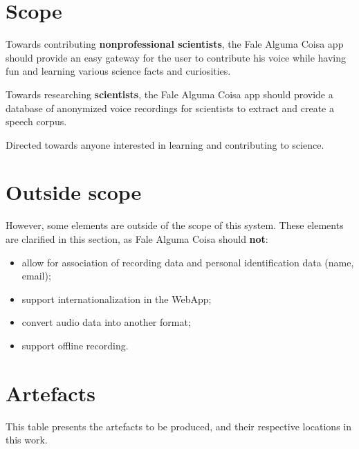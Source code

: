 \section{Scope}
\label{sec:app-scope}

Towards contributing \textbf{nonprofessional scientists}, the Fale Alguma Coisa app should provide an easy gateway for the user to contribute his voice while having fun and learning various science facts and curiosities.

Towards researching \textbf{scientists}, the Fale Alguma Coisa app should provide a database of anonymized voice recordings for scientists to extract and create a speech corpus.

Directed towards anyone interested in learning and contributing to science.

\section{Outside scope}

However, some elements are outside of the scope of this system. These elements are clarified in this section, as Fale Alguma Coisa should \textbf{not}:
\begin{itemize}
    \item allow for association of recording data and personal identification data (name, email);
    \item support internationalization in the WebApp;
    \item convert audio data into another format;
    \item support offline recording.
\end{itemize}

\section{Artefacts}
\label{sec:app-artefacts}

This table presents the artefacts to be produced, and their respective locations in this work.

